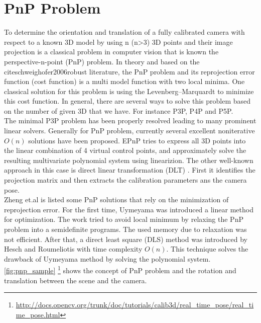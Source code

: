 \section{PnP Problem}
To determine the orientation and translation of a fully calibrated camera with respect to a known 3D model by using n (n>3) 3D points and their image projection is a classical problem in computer vision that is known the perspective-n-point (PnP) problem. In theory and based on the cite{schweighofer2006robust} literature, the PnP problem and its reprojection error function (cost function) is a multi model function with two local minima. One classical solution for this problem is using the Levenberg–Marquardt to minimize this cost function. In general, there are several ways to solve this problem based on the number of given 3D that we have. For instance P3P, P4P and P5P. \\
The minimal P3P problem has been properly resolved leading to many prominent linear solvers. Generally for PnP problem, currently several excellent noniterative $O(n)$ solutions have been proposed. EPnP \cite{lepetit2009epnp} tries to express all 3D points into the linear combination of 4 virtual control points, and approximately solve the resulting multivariate polynomial system using linearizion. The other well-known approach in this case is direct linear transformation (DLT) \cite{hartley2003multiple}. First it identifies the projection matrix and then extracts the calibration parameters ans the camera pose. \\
Zheng et.al \cite{zheng2013revisiting} is listed some PnP solutions that rely on the minimization of reprojection error. For the first time, Uymeyama \cite{umeyama1991least} was introduced a linear method for optimization. The work tried to avoid local minimum by relaxing the PnP problem into a semidefinite programs. The used memory due to relaxation was not efficient. After that, a direct least square (DLS) method was introduced by Hesch and Roumeliotis \cite{hesch2011direct} with time complexity $O(n)$. This technique solves the drawback of Uymeyama method by solving the polynomial system.\\
\autoref{fig:pnp_sample} \footnote{\url{http://docs.opencv.org/trunk/doc/tutorials/calib3d/real_time_pose/real_time_pose.html}} shows the concept of PnP problem and the rotation and translation between the scene and the camera.

